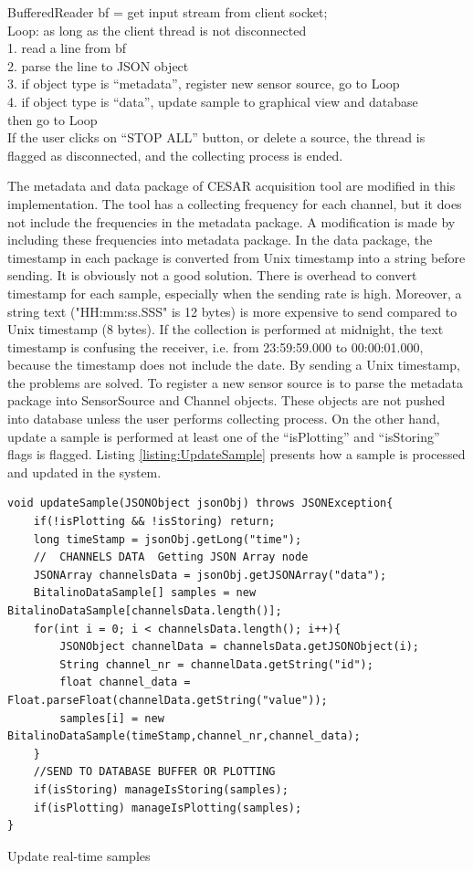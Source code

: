 \begin{adjustwidth}{1cm}{}
	BufferedReader bf = get input stream from client socket;\\
	Loop: as long as the client thread is not disconnected\\
		1.  read a line from bf\\
		2.  parse the line to JSON object\\
		3.  if object type is “metadata”, register new sensor source, go to Loop\\
		4.  if object type is “data”, update sample to graphical view and database\\
		     then go to Loop\\
	If the user clicks on “STOP ALL” button, or delete a source, the thread is flagged as disconnected, and the collecting process is ended.\\
\end{adjustwidth}
The metadata and data package of CESAR acquisition tool are modified in this implementation. The tool has a collecting frequency for each channel, but it does not include the frequencies in the metadata package. A modification is made by including these frequencies into metadata package. In the data package, the timestamp in each package is converted from Unix timestamp into a string before sending. It is obviously not a good solution. There is overhead to convert timestamp for each sample, especially when the sending rate is high. Moreover, a string text ("HH:mm:ss.SSS" is 12 bytes) is more expensive to send compared to Unix timestamp (8 bytes). If the collection is performed at midnight, the text timestamp is confusing the receiver, i.e. from 23:59:59.000 to 00:00:01.000, because the timestamp does not include the date. By sending a Unix timestamp, the problems are solved.
To register a new sensor source is to parse the metadata package into SensorSource and Channel objects. These objects are not pushed into database unless the user performs collecting process. On the other hand, update a sample is performed at least one of the “isPlotting” and “isStoring” flags is flagged. Listing \ref{listing:UpdateSample} presents how a sample is processed and updated in the system.
\begin{code}[ht]
\begin{lstlisting}
void updateSample(JSONObject jsonObj) throws JSONException{
    if(!isPlotting && !isStoring) return;
    long timeStamp = jsonObj.getLong("time");
    //  CHANNELS DATA  Getting JSON Array node
    JSONArray channelsData = jsonObj.getJSONArray("data");
    BitalinoDataSample[] samples = new BitalinoDataSample[channelsData.length()];
    for(int i = 0; i < channelsData.length(); i++){
        JSONObject channelData = channelsData.getJSONObject(i);
        String channel_nr = channelData.getString("id");
        float channel_data = Float.parseFloat(channelData.getString("value"));
        samples[i] = new BitalinoDataSample(timeStamp,channel_nr,channel_data);
    }
    //SEND TO DATABASE BUFFER OR PLOTTING
    if(isStoring) manageIsStoring(samples);
    if(isPlotting) manageIsPlotting(samples);
}
\end{lstlisting}
\caption[Update real-time samples]{Update real-time samples}
\label{listing:UpdateSample}
\end{code}
